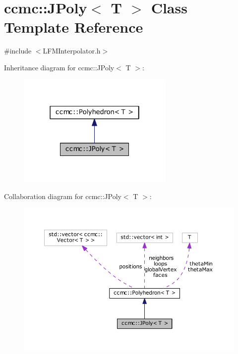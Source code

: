\hypertarget{classccmc_1_1_j_poly}{\section{ccmc\-:\-:J\-Poly$<$ T $>$ Class Template Reference}
\label{classccmc_1_1_j_poly}
}


{\ttfamily \#include $<$L\-F\-M\-Interpolator.\-h$>$}



Inheritance diagram for ccmc\-:\-:J\-Poly$<$ T $>$\-:
\nopagebreak
\begin{figure}[H]
\begin{center}
\leavevmode
\includegraphics[width=214pt]{classccmc_1_1_j_poly__inherit__graph}
\end{center}
\end{figure}


Collaboration diagram for ccmc\-:\-:J\-Poly$<$ T $>$\-:
\nopagebreak
\begin{figure}[H]
\begin{center}
\leavevmode
\includegraphics[width=350pt]{classccmc_1_1_j_poly__coll__graph}
\end{center}
\end{figure}

